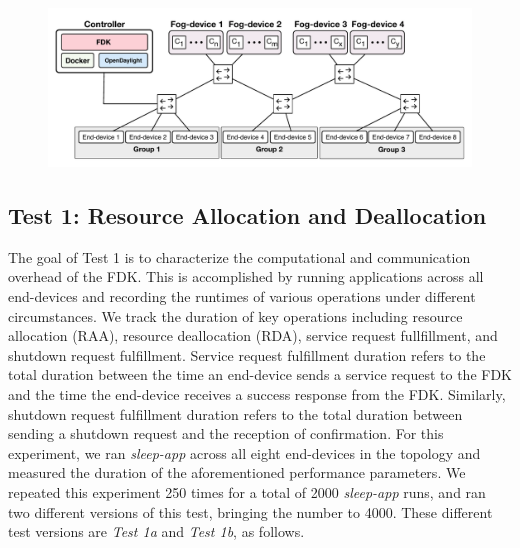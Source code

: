 \begin{figure}[t]
\centering
\includegraphics[width=0.95\linewidth]{topology.pdf}
  \label{topology}
\end{figure}



\subsection{Test 1: Resource Allocation and Deallocation}
The goal of Test 1 is to characterize the computational and communication overhead of the FDK.
This is accomplished by running applications across all end-devices and recording the runtimes of various operations under different circumstances.
We track the duration of key operations including resource allocation (RAA), resource deallocation (RDA), service request fullfillment, and shutdown request fulfillment.
Service request fulfillment duration refers to the total duration between the time an end-device sends a service request to the FDK and the time the end-device receives a success response from the FDK.
Similarly, shutdown request fulfillment duration refers to the total duration between sending a shutdown request and the reception of confirmation.
For this experiment, we ran \textit{sleep-app} across all eight end-devices in the topology and measured the duration of the aforementioned performance parameters.
We repeated this experiment 250 times for a total of 2000 \textit{sleep-app} runs, and ran two different versions of this test, bringing the number to 4000.
These different test versions are \textit{Test 1a} and \textit{Test 1b}, as follows.


